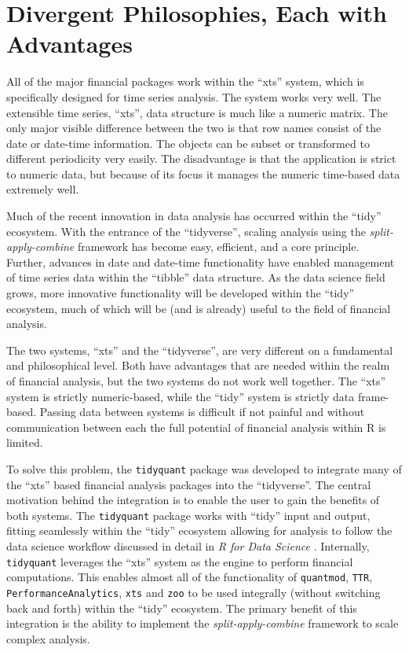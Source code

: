 \section{Divergent Philosophies, Each with
Advantages}\label{divergent-philosophies-each-with-advantages}

All of the major financial packages work within the ``xts'' system,
which is specifically designed for time series analysis. The system
works very well. The extensible time series, ``xts'', data structure is
much like a numeric matrix. The only major visible difference between
the two is that row names consist of the date or date-time information.
The objects can be subset or transformed to different periodicity very
easily. The disadvantage is that the application is strict to numeric
data, but because of its focus it manages the numeric time-based data
extremely well.

Much of the recent innovation in data analysis has occurred within the
``tidy'' ecosystem. With the entrance of the ``tidyverse'', scaling
analysis using the \emph{split-apply-combine} framework has become easy,
efficient, and a core principle. Further, advances in date and date-time
functionality have enabled management of time series data within the
``tibble'' data structure. As the data science field grows, more
innovative functionality will be developed within the ``tidy''
ecosystem, much of which will be (and is already) useful to the field of
financial analysis.

The two systems, ``xts'' and the ``tidyverse'', are very different on a
fundamental and philosophical level. Both have advantages that are
needed within the realm of financial analysis, but the two systems do
not work well together. The ``xts'' system is strictly numeric-based,
while the ``tidy'' system is strictly data frame-based. Passing data
between systems is difficult if not painful and without communication
between each the full potential of financial analysis within R is
limited.

To solve this problem, the \texttt{tidyquant} package was developed to
integrate many of the ``xts'' based financial analysis packages into the
``tidyverse''. The central motivation behind the integration is to
enable the user to gain the benefits of both systems. The
\texttt{tidyquant} package works with ``tidy'' input and output, fitting
seamlessly within the ``tidy'' ecosystem allowing for analysis to follow
the data science workflow discussed in detail in \emph{R for Data
Science} \citep{R4DS2017}. Internally, \texttt{tidyquant} leverages the
``xts'' system as the engine to perform financial computations. This
enables almost all of the functionality of \texttt{quantmod},
\texttt{TTR}, \texttt{PerformanceAnalytics}, \texttt{xts} and
\texttt{zoo} to be used integrally (without switching back and forth)
within the ``tidy'' ecosystem. The primary benefit of this integration
is the ability to implement the \emph{split-apply-combine} framework to
scale complex analysis.

